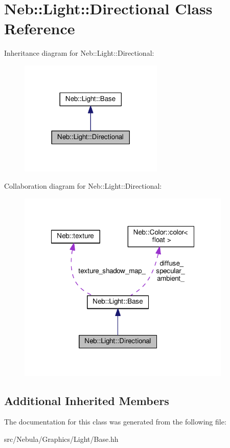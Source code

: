 \hypertarget{classNeb_1_1Light_1_1Directional}{\section{Neb\-:\-:Light\-:\-:Directional Class Reference}
\label{classNeb_1_1Light_1_1Directional}
}


Inheritance diagram for Neb\-:\-:Light\-:\-:Directional\-:
\nopagebreak
\begin{figure}[H]
\begin{center}
\leavevmode
\includegraphics[width=194pt]{classNeb_1_1Light_1_1Directional__inherit__graph}
\end{center}
\end{figure}


Collaboration diagram for Neb\-:\-:Light\-:\-:Directional\-:
\nopagebreak
\begin{figure}[H]
\begin{center}
\leavevmode
\includegraphics[width=288pt]{classNeb_1_1Light_1_1Directional__coll__graph}
\end{center}
\end{figure}
\subsection*{Additional Inherited Members}


The documentation for this class was generated from the following file\-:\begin{DoxyCompactItemize}
\item 
src/\-Nebula/\-Graphics/\-Light/Base.\-hh\end{DoxyCompactItemize}
